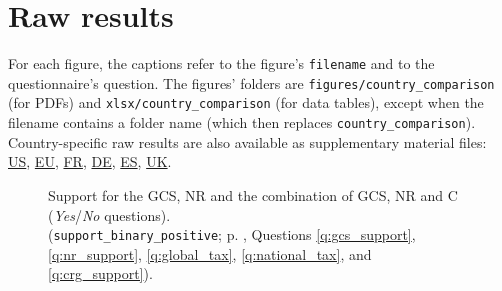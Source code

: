\clearpage
\section{Raw results%
}\label{app:raw_results}

For each figure, the captions refer to the figure's \verb|filename| and to the questionnaire's question. The figures' folders are \verb|figures/country_comparison| (for PDFs) and \verb|xlsx/country_comparison| (for data tables), except when the filename contains a folder name (which then replaces \verb|country_comparison|). 
Country-specific raw results are also available as supplementary material files:  \href{https://github.com/bixiou/international_attitudes_toward_global_policies/raw/main/paper/app_desc_stats_US.pdf}{US}, \href{https://github.com/bixiou/international_attitudes_toward_global_policies/raw/main/paper/app_desc_stats_EU.pdf}{EU}, \href{https://github.com/bixiou/international_attitudes_toward_global_policies/raw/main/paper/app_desc_stats_FR.pdf}{FR}, \href{https://github.com/bixiou/international_attitudes_toward_global_policies/raw/main/paper/app_desc_stats_DE.pdf}{DE}, \href{https://github.com/bixiou/international_attitudes_toward_global_policies/raw/main/paper/app_desc_stats_ES.pdf}{ES}, \href{https://github.com/bixiou/international_attitudes_toward_global_policies/raw/main/paper/app_desc_stats_UK.pdf}{UK}.

\begin{figure}[h!]
    \cprotect\caption[Support for the Global Climate Scheme]{Support for the GCS, NR and the combination of GCS, NR and C (\textit{Yes}/\textit{No} questions). \\(\verb|support_binary_positive|; p. \pageref{subsec:questionnaire_GCS}, Questions \ref{q:gcs_support}, \ref{q:nr_support}, \ref{q:global_tax}, \ref{q:national_tax}, and \ref{q:crg_support}).%
    }\label{fig:support_binary}
\end{figure}

